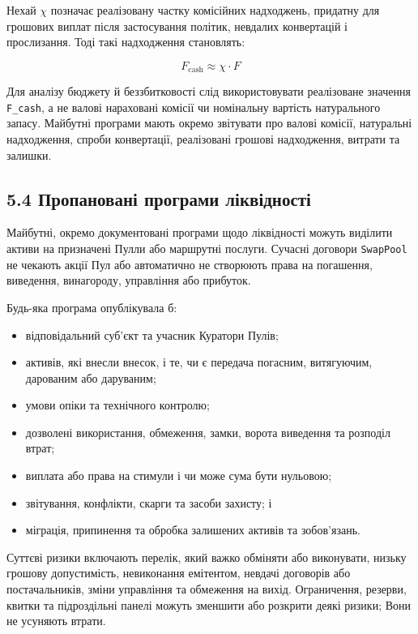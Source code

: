 \documentclass[11pt]{article}
\begin{document}
Нехай \texttt{$\chi$} позначає реалізовану частку комісійних надходжень, придатну для грошових виплат після застосування політик, невдалих конвертацій і прослизання. Тоді такі надходження становлять:

\[
F_{\mathrm{cash}} \approx \chi \cdot F
\]

Для аналізу бюджету й беззбитковості слід використовувати реалізоване значення \texttt{F\_cash}, а не валові нараховані комісії чи номінальну вартість натурального запасу. Майбутні програми мають окремо звітувати про валові комісії, натуральні надходження, спроби конвертації, реалізовані грошові надходження, витрати та залишки.

\subsection*{5.4 Пропановані програми ліквідності}

Майбутні, окремо документовані програми щодо ліквідності можуть виділити активи на призначені Пулли або маршрутні послуги. Сучасні договори \texttt{SwapPool} не чекають акції Пул або автоматично не створюють права на погашення, виведення, винагороду, управління або прибуток.

Будь-яка програма опублікувала б:

\begin{itemize}[leftmargin=*]
\item відповідальний суб'єкт та учасник Куратори Пулів;
\item активів, які внесли внесок, і те, чи є передача погасним, витягуючим, дарованим або даруваним;
\item умови опіки та технічного контролю;
\item дозволені використання, обмеження, замки, ворота виведення та розподіл втрат;
\item виплата або права на стимули і чи може сума бути нульовою;
\item звітування, конфлікти, скарги та засоби захисту; і
\item міграція, припинення та обробка залишених активів та зобов'язань.
\end{itemize}
Суттєві ризики включають перелік, який важко обміняти або виконувати, низьку грошову допустимість, невиконання емітентом, невдачі договорів або постачальників, зміни управління та обмеження на вихід. Ограничення, резерви, квитки та підроздільні панелі можуть зменшити або розкрити деякі ризики; Вони не усуняють втрати.
\end{document}
